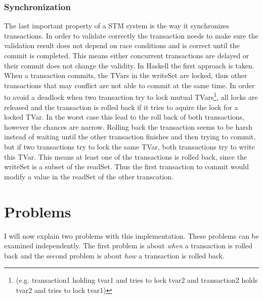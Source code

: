 \subsubsection{Synchronization} The last important property of a STM system is the way it synchronizes transactions. In order to validate
correctly the transaction needs to make sure the validation result does not depend on race conditions and is correct until the commit 
is completed. This means either concurrent transactions are delayed or their commit does not change the validity. In Haskell the first
approach is taken. When a transaction commits, the TVars in the writeSet are locked, thus other transactions that may conflict are not 
able to commit at the same time. In order to avoid a deadlock when two transaction try to lock mutual TVars\footnote{(e.g. transaction1 holding
tvar1 and tries to lock tvar2 and transaction2 holds tvar2 and tries to lock tvar1)}, all locks are released and the transaction
is rolled back if it tries to aquire the lock for a locked TVar. In the worst case this lead to the roll back of both transactions, 
however the chances are narrow. Rolling back the transaction seems to be harsh instead of waiting until the other transaction finishes 
and then trying to commit, but if two transactions try to lock the same TVar, both transactions try to write this TVar. 
This means at least one of the transactions is rolled back, since the writeSet is a subset of the readSet. 
Thus the first transaction to commit would modify a value in the readSet of the other transcation.

\section{Problems}
I will now explain two problems with this implementation. These problems can be examined independently. The first problem is about
\textit{when} a transaction is rolled back and the second problem is about \textit{how} a transaction is rolled back.

